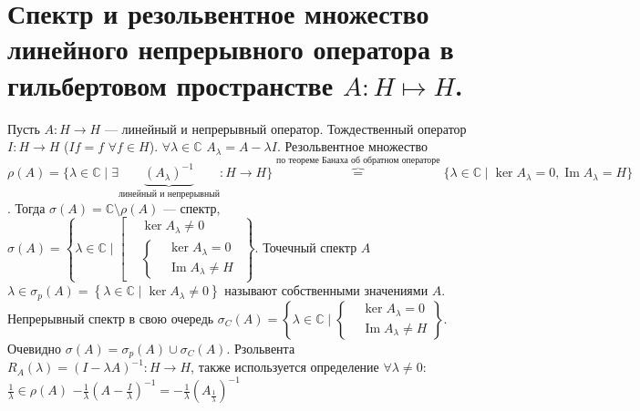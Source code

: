 \documentclass[12pt]{article}
\DeclareMathOperator{\Imm}{Im}
\newcommand{\Al}{A_\lambda}
\newcommand{\Rez}{(I - \lambda A)^{-1}}
\begin{document}
\newtheorem{Theor}{Теорема}
\newtheorem{Opr}{Опреление}
\newtheorem{Prim}{Пример}
\newtheorem{Upr}{Упражнение}
\newtheorem{Nabl}{Наблюдение}
\newtheorem{Zam}{Замечание}
\section*{Спектр и резольвентное множество линейного непрерывного оператора в гильбертовом пространстве $A : H \mapsto H$.}
Пусть $A : H \to H$ --- линейный и непрерывный оператор.
Тождественный оператор $I : H \to H$ ($If = f$ $\forall f \in H$).
$\forall \lambda \in \mathbb C$ $A_\lambda = A - \lambda I$.
Резольвентное множество $\rho(A) = \{ \lambda \in \mathbb C \mid \exists \underbrace{(A_\lambda)^{-1}}_{\text{линейный и непрерывный}} : H \to H \} 
\overbrace{=}^{\text{по теореме Банаха об обратном операторе}} \{ \lambda \in \mathbb C \mid \ker A_\lambda = 0, \Imm A_\lambda = H \}$.
Тогда $\sigma(A) = \mathbb C \setminus \rho(A)$ --- спектр, $\sigma(A) = \left \{ \lambda \in \mathbb C \mid 
\left [
    \begin{aligned}
        &\ker A_\lambda \ne 0\\
        &\left \{
            \begin{aligned}
                &\ker \Al = 0\\
                &\Imm \Al \ne H
            \end{aligned}
            \right.
    \end{aligned}
\right.\right\}$.
Точечный спектр $A$ $\lambda \in \sigma_p(A)= \left \{ \lambda \in \mathbb C \mid \ker A_\lambda \ne 0 \right\}$ называют собственными значениями $A$.
Непрерывный спектр в свою очередь $\sigma_C(A) =  \left \{ \lambda \in \mathbb C \mid 
\left\{
    \begin{aligned}
                &\ker \Al = 0\\
                &\Imm \Al \ne H
    \end{aligned}
\right.\right \}$.
Очевидно $\sigma(A) = \sigma_p(A) \cup \sigma_C(A)$.
Рзольвента $R_A(\lambda) = \Rez : H \to H$, также используется определение
$\forall \lambda \ne 0$: $\frac{1}{\lambda} \in \rho(A)$ $-\frac{1}{\lambda}(A - \frac{I}{\lambda})^{-1} = -\frac{1}{\lambda}(A_{\frac1{\lambda}})^{-1}$
\end{document}
